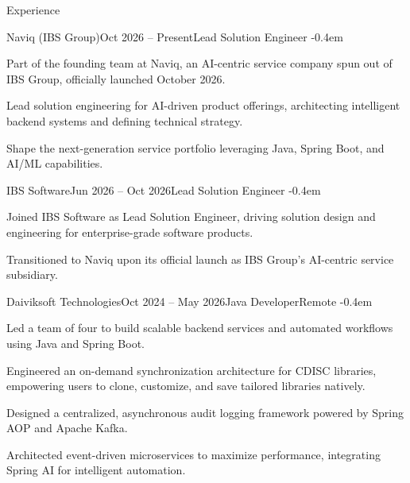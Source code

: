 \documentclass{resume} %
\begin{document}
\begin{rSection}{Experience}

\begin{rSubsection}{Naviq (IBS Group)}{Oct 2026 -- Present}{Lead Solution Engineer}{}
    \itemsep -0.4em
    \vspace{-0.5em}

    \item Part of the founding team at Naviq, an AI-centric service company spun out of IBS Group, officially launched October 2026.
    \item Lead solution engineering for AI-driven product offerings, architecting intelligent backend systems and defining technical strategy.
    \item Shape the next-generation service portfolio leveraging Java, Spring Boot, and AI/ML capabilities.
\end{rSubsection}
\vspace{-0.4em}

\begin{rSubsection}{IBS Software}{Jun 2026 -- Oct 2026}{Lead Solution Engineer}{}
    \itemsep -0.4em
    \vspace{-0.5em}

    \item Joined IBS Software as Lead Solution Engineer, driving solution design and engineering for enterprise-grade software products.
    \item Transitioned to Naviq upon its official launch as IBS Group's AI-centric service subsidiary.
\end{rSubsection}
\vspace{-0.4em}

\begin{rSubsection}{Daiviksoft Technologies}{Oct 2024 -- May 2026}{Java Developer}{Remote}
    \itemsep -0.4em
    \vspace{-0.5em}


    \item Led a team of four to build scalable backend services and automated workflows using Java and Spring Boot.
    \item Engineered an on-demand synchronization architecture for CDISC libraries, empowering users to clone, customize, and save tailored libraries natively.
    \item Designed a centralized, asynchronous audit logging framework powered by Spring AOP and Apache Kafka.
    \item Architected event-driven microservices to maximize performance, integrating Spring AI for intelligent automation.
\end{rSubsection}
\vspace{-0.4em}


\end{rSection}
\end{document}
